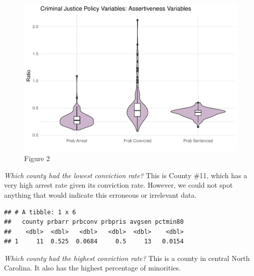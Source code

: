 \documentclass[]{article}
\newenvironment{Shaded}{\begin{snugshade}}{\end{snugshade}}
\newcommand{\KeywordTok}[1]{\textcolor[rgb]{0.13,0.29,0.53}{\textbf{#1}}}
\newcommand{\NormalTok}[1]{#1}
\newcommand{\OperatorTok}[1]{\textcolor[rgb]{0.81,0.36,0.00}{\textbf{#1}}}
\newcommand{\StringTok}[1]{\textcolor[rgb]{0.31,0.60,0.02}{#1}}
\begin{document}
\begin{figure}

{\centering \includegraphics{lab_3_v7_files/figure-latex/unnamed-chunk-12-1} 

}

\caption{Figure 2}\label{fig:unnamed-chunk-12}
\end{figure}

\emph{Which county had the lowest conviction rate?} This is County \#11,
which has a very high arrest rate given its conviction rate. However, we
could not spot anything that would indicate this erroneous or irrelevant
data.

\begin{Shaded}
\end{Shaded}

\begin{verbatim}
## # A tibble: 1 x 6
##   county prbarr prbconv prbpris avgsen pctmin80
##    <dbl>  <dbl>   <dbl>   <dbl>  <dbl>    <dbl>
## 1     11  0.525  0.0684     0.5     13   0.0154
\end{verbatim}

\emph{Which county had the highest conviction rate?} This is a county in
central North Carolina. It also has the highest percentage of
minorities.

\begin{Shaded}
\end{Shaded}
\end{document}
